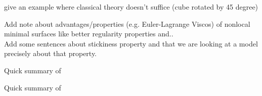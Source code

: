 \begin{TODO}
	give an example where classical theory doesn't suffice (cube rotated by 45 degree)
\end{TODO}

\begin{TODO}
	Add note about advantages/properties (e.g. Euler-Lagrange Viscos) of nonlocal minimal
	surfaces like better regularity properties and..\\
	Add some sentences about stickiness property and that we are looking at a model
	precisely about that property.
\end{TODO}

\begin{TODO}
	Quick summary of 
\end{TODO}

\begin{TODO}
	Quick summary of 
\end{TODO}